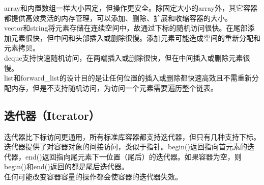 array和内置数组一样大小固定，但操作更安全。除固定大小的array外，其它容器都提供高效灵活的内存管理，可以添加、删除、扩展和收缩容器的大小。 \\

vector和string将元素存储在连续空间中，故通过下标的随机访问很快。在尾部添加元素很快，但中间和头部插入或删除很慢。添加元素可能造成空间的重新分配和元素拷贝。 \\

deque支持快速随机访问，在两端插入或删除很快，但在中间插入或删除元素很慢。 \\

list和forward\_list的设计目的是让任何位置的插入或删除都快速高效且不需重新分配内存，但是不支持随机访问，为访问一个元素需要遍历整个链表。

\subsection{迭代器（Iterator）}

迭代器比下标访问更通用，所有标准库容器都支持迭代器，但只有几种支持下标。迭代器提供了对容器对象的间接访问，类似于指针。begin()返回指向首元素的迭代器，end()返回指向尾元素下一位置（尾后）的迭代器。如果容器为空，则begin()和end()返回的都是尾后迭代器。 \\

任何可能改变容器容量的操作都会使容器的迭代器失效。

\begin{table}[H]
	\centering
	\caption{迭代器}
\end{table}

